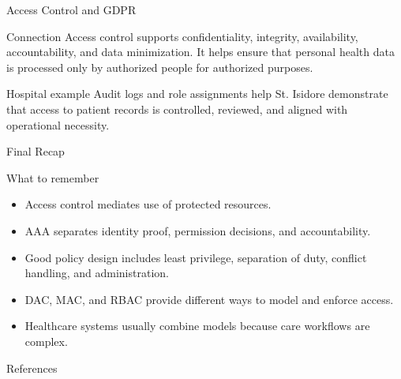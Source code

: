 \documentclass[presentation]{beamer}
\begin{document}
\begin{frame}[c]{Access Control and GDPR}
\begin{block}{Connection}
Access control supports confidentiality, integrity, availability, accountability, and data
minimization. It helps ensure that personal health data is processed only by authorized people for
authorized purposes.
\end{block}

\begin{exampleblock}{Hospital example}
Audit logs and role assignments help St. Isidore demonstrate that access to patient records is
controlled, reviewed, and aligned with operational necessity.
\end{exampleblock}
\end{frame}

\begin{frame}[c]{Final Recap}
\begin{block}{What to remember}
\begin{itemize}
    \item Access control mediates use of protected resources.
    \item AAA separates identity proof, permission decisions, and accountability.
    \item Good policy design includes least privilege, separation of duty, conflict handling, and administration.
    \item DAC, MAC, and RBAC provide different ways to model and enforce access.
    \item Healthcare systems usually combine models because care workflows are complex.
\end{itemize}
\end{block}
\end{frame}

\begin{frame}[allowframebreaks]{References}


\end{frame}
\end{document}
